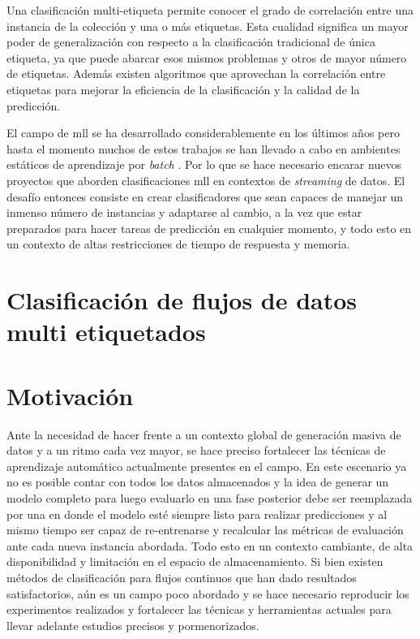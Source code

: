 Una clasificación multi-etiqueta permite conocer el grado de correlación entre
una instancia de la colección y una o más etiquetas. Esta cualidad significa un
mayor poder de generalización con respecto a la clasificación tradicional de
única etiqueta, ya que puede abarcar esos mismos problemas y otros de mayor
número de etiquetas. Además existen algoritmos que aprovechan la correlación
entre etiquetas para mejorar la eficiencia de la clasificación y la calidad de
la predicción.

El campo de \acrshort{mll} se ha desarrollado considerablemente en los últimos
años pero hasta el momento muchos de estos trabajos se han llevado a cabo en
ambientes estáticos de aprendizaje por \textit{batch}
\cite{read_classifier_2011}. Por lo que se hace necesario encarar nuevos
proyectos que aborden clasificaciones \acrshort{mll} en contextos de
\textit{streaming} de datos. El desafío entonces consiste en crear
clasificadores que sean capaces de manejar un inmenso número de instancias y
adaptarse al cambio, a la vez que estar preparados para hacer tareas de
predicción en cualquier momento, y todo esto en un contexto de altas
restricciones de tiempo de respuesta y memoria.

\section{Clasificación de flujos de datos multi etiquetados}  
 


\section{Motivación} 

Ante la necesidad de hacer frente a un contexto global de generación masiva de
datos y a un ritmo cada vez mayor, se hace preciso fortalecer las técnicas de
aprendizaje automático actualmente presentes en el campo. En este escenario ya
no es posible contar con todos los datos almacenados y la idea de generar un
modelo completo para luego evaluarlo en una fase posterior debe ser reemplazada
por una en donde el modelo esté siempre listo para realizar predicciones y al
mismo tiempo ser capaz de re-entrenarse y recalcular las métricas de evaluación
ante cada nueva instancia abordada. Todo esto en un contexto cambiante, de alta
disponibilidad y limitación en el espacio de almacenamiento. Si bien existen
métodos de clasificación para flujos continuos que han dado resultados
satisfactorios, aún es un campo poco abordado y se hace necesario reproducir los
experimentos realizados y fortalecer las técnicas y herramientas actuales para
llevar adelante estudios precisos y pormenorizados.

